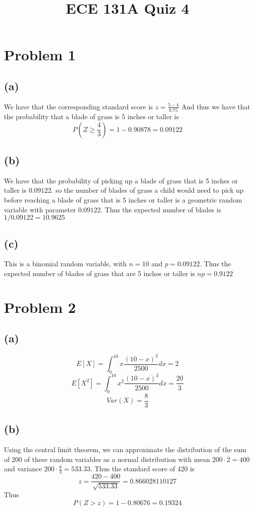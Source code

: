 
\title{ECE 131A Quiz 4}

\maketitle
\section*{Problem 1}
\subsection*{(a)}
We have that the corresponding standard score is 
$z=\frac{5-4}{0.75}$
And thus we have that the probability that a blade of grass
is 5 inches or taller is 
$$P(Z\geq\frac{4}{3})=1-0.90878=\boxed{0.09122}$$
\subsection*{(b)}
We have that the probability of picking up a blade of
grass that is 5 inches or taller is $0.09122$. so the number
of blades of grass a child would need to pick up before reaching 
a blade of grass that is 5 inches or taller is a geometric random
variable with parameter $0.09122$. Thus the expected number of blades
is $1/0.09122=\boxed{10.9625}$
\subsection*{(c)}
This is a binomial random variable, with $n=10$ and $p=0.09122$.
Thus the expected number of blades of grass that are 5 inches or taller
is $np=\boxed{0.9122}$
\section*{Problem 2}
\subsection*{(a)}
$$E[X]=\int_{0}^{10}x\frac{(10-x)^3}{2500}dx=\boxed{2}$$
$$E[X^2]=\int_{0}^{10}x^2\frac{(10-x)^3}{2500}dx=\frac{20}{3}$$
$$Var(X)=\boxed{\frac{8}{3}}$$
\subsection*{(b)}
Using the central limit theorem, we can approximate the 
distribution of the sum of 200 of these random variables
as a normal distribution with mean $200\cdot2=400$ and variance
$200\cdot\frac{8}{3}=533.33$. Thus the standard
score of $420$ is
$$z=\frac{420-400}{\sqrt{533.33}}=0.866028110127$$
Thus 
$$P(Z>z)=1-0.80676=\boxed{0.19324}$$
